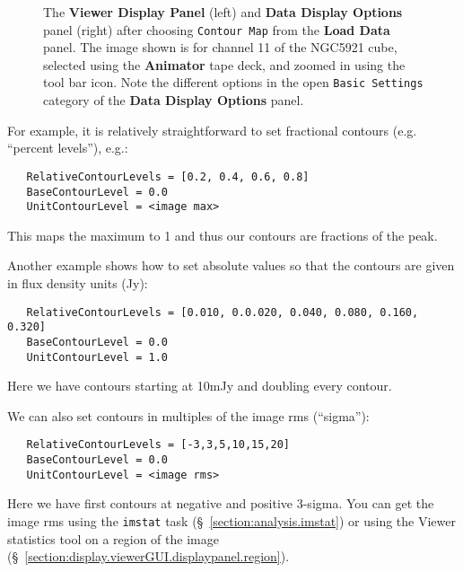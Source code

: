  
\begin{figure}[h!]
\begin{center}
\caption{\label{fig:viewer_con} The {\bf Viewer Display Panel}
(left) and {\bf Data Display Options} panel (right) after choosing
{\tt Contour Map} from the {\bf Load Data} panel.  The
image shown is for channel 11 of the NGC5921 cube, selected using
the {\bf Animator} tape deck, and zoomed in using the tool bar icon.
Note the different options in the open {\tt Basic Settings} category
of the {\bf Data Display Options} panel.} 
\hrulefill
\end{center}
\end{figure}

For example, it is relatively straightforward to set fractional
contours (e.g. ``percent levels''), e.g.:
\small
\begin{verbatim}
   RelativeContourLevels = [0.2, 0.4, 0.6, 0.8]
   BaseContourLevel = 0.0
   UnitContourLevel = <image max>
\end{verbatim}
\normalsize
This maps the maximum to 1 and thus our contours are fractions of
the peak.

Another example shows how to set absolute values so that the contours
are given in flux density units (Jy):
\small
\begin{verbatim}
   RelativeContourLevels = [0.010, 0.0.020, 0.040, 0.080, 0.160, 0.320]
   BaseContourLevel = 0.0
   UnitContourLevel = 1.0
\end{verbatim}
\normalsize
Here we have contours starting at 10mJy and doubling every contour.

We can also set contours in multiples of the image rms (``sigma''):
\small
\begin{verbatim}
   RelativeContourLevels = [-3,3,5,10,15,20]
   BaseContourLevel = 0.0
   UnitContourLevel = <image rms>
\end{verbatim}
\normalsize
Here we have first contours at negative and positive 3-sigma.
You can get the image rms using the {\tt imstat} task 
(\S~\ref{section:analysis.imstat}) or using the Viewer statistics
tool on a region of the image 
(\S~\ref{section:display.viewerGUI.displaypanel.region}).

